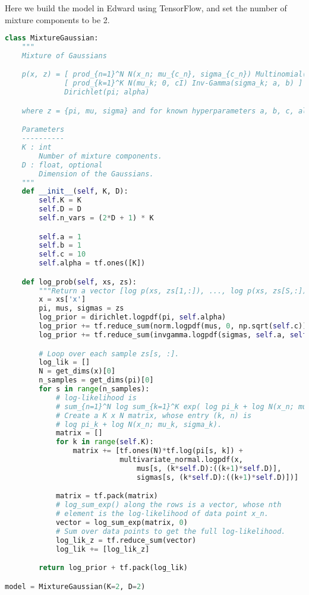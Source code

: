 Here we build the model in Edward using TensorFlow, and set the number
of mixture components to be 2.
\begin{lstlisting}[language=Python]
class MixtureGaussian:
    """
    Mixture of Gaussians

    p(x, z) = [ prod_{n=1}^N N(x_n; mu_{c_n}, sigma_{c_n}) Multinomial(c_n; pi) ]
              [ prod_{k=1}^K N(mu_k; 0, cI) Inv-Gamma(sigma_k; a, b) ]
              Dirichlet(pi; alpha)

    where z = {pi, mu, sigma} and for known hyperparameters a, b, c, alpha.

    Parameters
    ----------
    K : int
        Number of mixture components.
    D : float, optional
        Dimension of the Gaussians.
    """
    def __init__(self, K, D):
        self.K = K
        self.D = D
        self.n_vars = (2*D + 1) * K

        self.a = 1
        self.b = 1
        self.c = 10
        self.alpha = tf.ones([K])

    def log_prob(self, xs, zs):
        """Return a vector [log p(xs, zs[1,:]), ..., log p(xs, zs[S,:])]."""
        x = xs['x']
        pi, mus, sigmas = zs
        log_prior = dirichlet.logpdf(pi, self.alpha)
        log_prior += tf.reduce_sum(norm.logpdf(mus, 0, np.sqrt(self.c)), 1)
        log_prior += tf.reduce_sum(invgamma.logpdf(sigmas, self.a, self.b), 1)

        # Loop over each sample zs[s, :].
        log_lik = []
        N = get_dims(x)[0]
        n_samples = get_dims(pi)[0]
        for s in range(n_samples):
            # log-likelihood is
            # sum_{n=1}^N log sum_{k=1}^K exp( log pi_k + log N(x_n; mu_k, sigma_k) )
            # Create a K x N matrix, whose entry (k, n) is
            # log pi_k + log N(x_n; mu_k, sigma_k).
            matrix = []
            for k in range(self.K):
                matrix += [tf.ones(N)*tf.log(pi[s, k]) +
                           multivariate_normal.logpdf(x,
                               mus[s, (k*self.D):((k+1)*self.D)],
                               sigmas[s, (k*self.D):((k+1)*self.D)])]

            matrix = tf.pack(matrix)
            # log_sum_exp() along the rows is a vector, whose nth
            # element is the log-likelihood of data point x_n.
            vector = log_sum_exp(matrix, 0)
            # Sum over data points to get the full log-likelihood.
            log_lik_z = tf.reduce_sum(vector)
            log_lik += [log_lik_z]

        return log_prior + tf.pack(log_lik)

model = MixtureGaussian(K=2, D=2)
\end{lstlisting}


